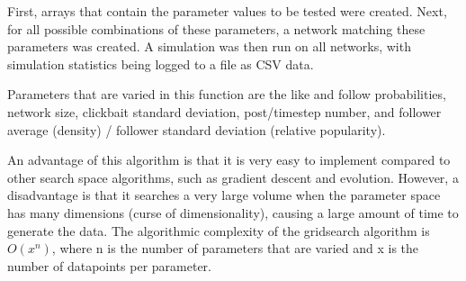 \documentclass{article}
\begin{document}
First, arrays that contain the parameter values to be tested were created.
Next, for all possible combinations of these parameters, a network
matching these parameters was created. A simulation was then run on all networks,
with simulation statistics being logged to a file as CSV data.

Parameters that are varied in this function are the like and follow probabilities,
network size, clickbait standard deviation, post/timestep number, and
follower average (density) / follower standard deviation (relative popularity).

An advantage of this algorithm is that it is very easy to implement compared to
other search space algorithms, such as gradient descent and evolution.
However, a disadvantage is that it searches a very large volume when the parameter
space has many dimensions (curse of dimensionality), causing a large amount of
time to generate the data. The algorithmic complexity of the gridsearch algorithm
is $O(x^n)$, where n is the number of parameters that are varied and x is the number
of datapoints per parameter.
\end{document}

